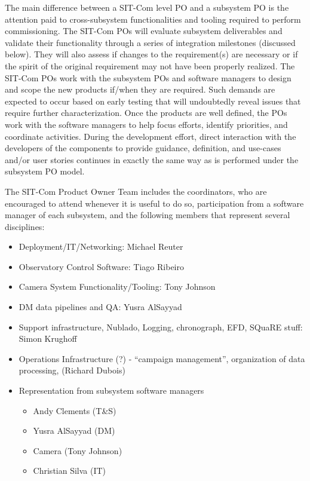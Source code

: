 \documentclass[SE,lsstdraft,authoryear,toc]{lsstdoc}
\begin{document}
The main difference between a SIT-Com level PO and a subsystem PO is the attention paid to cross-subsystem functionalities and tooling required to perform commissioning.
The SIT-Com POs will evaluate subsystem deliverables and validate their functionality through a series of integration milestones (discussed below).
They will also assess if changes to the requirement(s) are necessary or if the spirit of the original requirement may not have been properly realized.
The SIT-Com POs work with the subsystem POs and software managers to design and scope the new products if/when they are required.
Such demands are expected to occur based on early testing that will undoubtedly reveal issues that require further characterization.
Once the products are well defined, the POs work with the software managers to help focus efforts, identify priorities, and coordinate activities.
During the development effort, direct interaction with the developers of the components to provide guidance, definition, and use-cases and/or user stories continues in exactly the same way as is performed under the subsystem PO model.

The SIT-Com Product Owner Team includes the coordinators, who are encouraged to attend whenever it is useful to do so, participation from a software manager of each subsystem, and the following members that represent several disciplines:

\begin{itemize}
    \item Deployment/IT/Networking: Michael Reuter
    \item Observatory Control Software: Tiago Ribeiro
    \item Camera System Functionality/Tooling: Tony Johnson
    \item DM data pipelines and QA: Yusra AlSayyad
    \item Support infrastructure, Nublado, Logging, chronograph, EFD, SQuaRE stuff: Simon Krughoff
    \item Operations Infrastructure (?) -  “campaign management”, organization of data processing,  (Richard Dubois)
    \item Representation from subsystem software managers
    \begin{itemize}
        \item Andy Clements (T\&S)
        \item Yusra AlSayyad (DM)
        \item Camera (Tony Johnson)
        \item Christian Silva (IT)
    \end{itemize}

\end{itemize}
\end{document}
